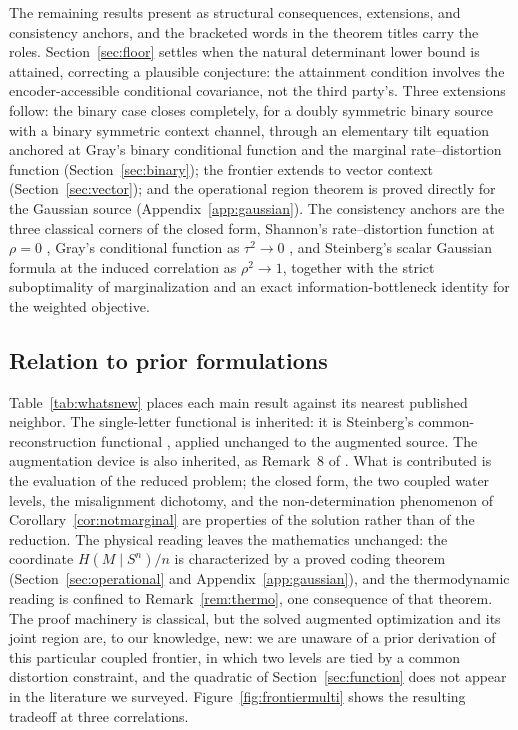 ﻿\documentclass[11pt,onecolumn]{IEEEtran}
\begin{document}
The remaining results present as structural consequences, extensions, and
consistency anchors, and the bracketed words in the theorem titles carry
the roles. Section~\ref{sec:floor} settles when the natural determinant
lower bound is attained, correcting a plausible conjecture: the
attainment condition involves the encoder-accessible conditional
covariance, not the third party's. Three extensions follow: the binary
case closes completely, for a doubly symmetric binary source with a
binary symmetric context channel, through an elementary tilt equation
anchored at Gray's binary conditional function and the marginal
rate--distortion function (Section~\ref{sec:binary}); the frontier
extends to vector context (Section~\ref{sec:vector}); and the operational
region theorem is proved directly for the Gaussian source
(Appendix~\ref{app:gaussian}). The consistency anchors are the three
classical corners of the closed form, Shannon's rate--distortion function
at $\rho=0$ \cite{shannon1959}, Gray's conditional function as
$\tau^2\to0$ \cite{gray1973}, and Steinberg's scalar Gaussian formula at
the induced correlation as $\rho^2\to1$, together with the strict
suboptimality of marginalization and an exact information-bottleneck
identity for the weighted objective.

\subsection*{Relation to prior formulations}

Table~\ref{tab:whatsnew} places each main result against its nearest
published neighbor. The single-letter functional is inherited: it is
Steinberg's common-reconstruction functional \cite{steinberg2009},
applied unchanged to the augmented source. The augmentation device is
also inherited, as Remark~8 of \cite{lapidoth2014}. What is contributed
is the evaluation of the reduced problem; the closed form, the two
coupled water levels, the misalignment dichotomy, and the
non-determination phenomenon of Corollary~\ref{cor:notmarginal} are
properties of the solution rather than of the reduction. The physical
reading leaves the mathematics unchanged: the coordinate
$H(M\mid S^n)/n$ is characterized by a proved coding theorem
(Section~\ref{sec:operational} and Appendix~\ref{app:gaussian}), and
the thermodynamic reading is confined to Remark~\ref{rem:thermo}, one
consequence of that theorem. The proof
machinery is classical, but the solved augmented optimization and its
joint region are, to our knowledge, new: we are unaware of a prior
derivation of this particular coupled frontier, in which two levels are
tied by a common distortion constraint, and the quadratic of
Section~\ref{sec:function} does not appear in the literature we surveyed.
Figure~\ref{fig:frontiermulti} shows the resulting tradeoff at three
correlations.
\end{document}
